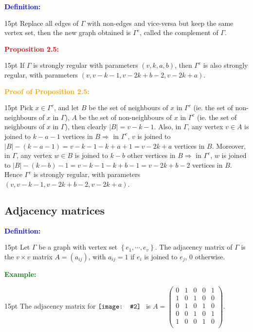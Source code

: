 \documentclass[12pt]{article}
\newcommand{\noparskip}{\vspace{-\parskip}}
\newenvironment{dent}
	{\begin{adjustwidth}{15pt}{}\noparskip}
	{\end{adjustwidth}}
\newenvironment{result}[1]
	{\textcolor{Red}{\textbf{#1:}}\begin{dent}}
	{\end{dent}}
\newenvironment{proof}[1]
	{\textcolor{Orange}{\textbf{Proof of #1:}}\begin{dent}}
	{\end{dent}}
\newenvironment{definition}
	{\textcolor{Blue}{\textbf{Definition:}}\begin{dent}}
	{\end{dent}}
\newenvironment{example}
	{\textcolor{Green}{\textbf{Example:}}\begin{dent}}
	{\end{dent}}
\newcommand{\pic}[2][1.0]{
	$\vcenter{\hbox{\texttt{[image: \#2]}\ }}$}
\renewcommand{\implies}{\Rightarrow}
\newcommand{\set}[1]{\left\{ #1 \right\}}
\newcommand{\sizeof}[1]{\left| #1 \right|}
\begin{document}
\begin{definition}
Replace all edges of $\Gamma$ with non-edges and vice-versa but keep the same vertex set, then the new graph obtained is $\Gamma^c$, called the complement of $\Gamma$.
\end{definition}

\begin{result}{Proposition 2.5}
If $\Gamma$ is strongly regular with parameters $(v, k, a, b)$, then $\Gamma^c$ is also strongly regular, with parameters $(v, v - k - 1, v - 2k + b - 2, v - 2k + a)$.
\end{result}

\begin{proof}{Proposition 2.5}
Pick $x \in \Gamma^c$, and let $B$ be the set of neighbours of $x$ in $\Gamma^c$ (ie. the set of non-neighbours of $x$ in $\Gamma$), $A$ be the set of non-neighbours of $x$ in $\Gamma^c$ (ie. the set of neighbours of $x$ in $\Gamma$), then clearly $\sizeof{B} = v - k - 1$. Also, in $\Gamma$, any vertex $v \in A$ is joined to $k - a - 1$ vertices in $B \implies$ in $\Gamma^c$, $v$ is joined to $\sizeof{B} - (k - a - 1) = v - k - 1 - k + a + 1 = v - 2k + a$ vertices in $B$. Moreover, in $\Gamma$, any vertex $w \in B$ is joined to $k - b$ other vertices in $B \implies$ in $\Gamma^c$, $w$ is joined to $\sizeof{B} - (k - b) - 1 = v - k - 1 - k + b - 1 = v - 2k + b - 2$ vertices in $B$. Hence $\Gamma^c$ is strongly regular, with parameters $(v, v - k - 1, v - 2k + b - 2, v - 2k + a)$.
\end{proof}

\subsection{Adjacency matrices}

\begin{definition}
Let $\Gamma$ be a graph with vertex set $\set{e_1, \cdots, e_v}$. The adjacency matrix of $\Gamma$ is the $v \times v$ matrix $A = (a_{ij})$, with $a_{ij} = 1$ if $e_i$ is joined to $e_j$, 0 otherwise.
\end{definition}

\begin{example}
The adjacency matrix for \pic[0.3]{12.png} is $A = \begin{pmatrix}
0 & 1 & 0 & 0 & 1 \\
1 & 0 & 1 & 0 & 0 \\
0 & 1 & 0 & 1 & 0 \\
0 & 0 & 1 & 0 & 1 \\
1 & 0 & 0 & 1 & 0 \\
\end{pmatrix}$.
\end{example}
\end{document}
